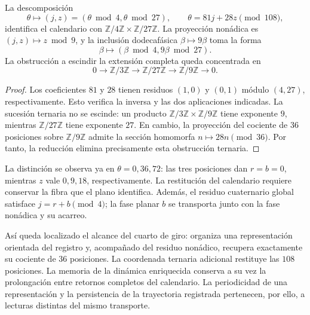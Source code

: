 \begin{proposition}
\label{ins29:xii:extension}
La descomposición
\[
 \theta\longmapsto(j,z)=(\theta\bmod4,\theta\bmod27),
 \qquad \theta=81j+28z\pmod{108},
\]
identifica el calendario con
\(\mathbb Z/4\mathbb Z\times\mathbb Z/27\mathbb Z\).
La proyección nonádica es \((j,z)\mapsto z\bmod9\), y la inclusión
dodecafásica \(\beta\mapsto9\beta\) toma la forma
\[
 \beta\longmapsto(\beta\bmod4,9\beta\bmod27).
\]
La obstrucción a escindir la extensión completa queda concentrada en
\[
 0\longrightarrow\mathbb Z/3\mathbb Z
 \longrightarrow\mathbb Z/27\mathbb Z
 \longrightarrow\mathbb Z/9\mathbb Z\longrightarrow0.
\]
\end{proposition}
\begin{proof}
Los coeficientes \(81\) y \(28\) tienen residuos \((1,0)\) y \((0,1)\)
módulo \((4,27)\), respectivamente. Esto verifica la inversa y las dos
aplicaciones indicadas. La sucesión ternaria no se escinde: un producto
\(\mathbb Z/3\mathbb Z\times\mathbb Z/9\mathbb Z\) tiene exponente
\(9\), mientras \(\mathbb Z/27\mathbb Z\) tiene exponente \(27\).
En cambio, la proyección del cociente de \(36\) posiciones sobre
\(\mathbb Z/9\mathbb Z\) admite la sección homomorfa
\(n\mapsto28n\pmod{36}\). Por tanto, la reducción elimina precisamente
esta obstrucción ternaria.
\end{proof}

La distinción se observa ya en \(\theta=0,36,72\): las tres posiciones
dan \(r=b=0\), mientras \(z\) vale \(0,9,18\), respectivamente.
La restitución del calendario requiere conservar la fibra que el plano
identifica. Además, el residuo cuaternario global satisface
\(j=r+b\pmod4\); la fase planar \(b\) se transporta junto con la fase
nonádica y su acarreo.

Así queda localizado el alcance del cuarto de giro: organiza una
representación orientada del registro y, acompañado del residuo nonádico,
recupera exactamente su cociente de \(36\) posiciones. La coordenada
ternaria adicional restituye las \(108\) posiciones. La memoria de la
dinámica enriquecida conserva a su vez la prolongación entre retornos
completos del calendario. La periodicidad de una representación y la
persistencia de la trayectoria registrada pertenecen, por ello, a lecturas distintas
del mismo transporte.
